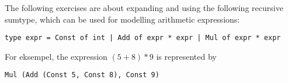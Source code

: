 The following exercises are about expanding and using the following
recursive sumtype, which can be used for modelling arithmetic expressions:
\begin{lstlisting}
type expr = Const of int | Add of expr * expr | Mul of expr * expr 
\end{lstlisting}
For eksempel, the expression $(5 + 8) * 9$ is represented by 
\begin{lstlisting}
Mul (Add (Const 5, Const 8), Const 9)
\end{lstlisting}